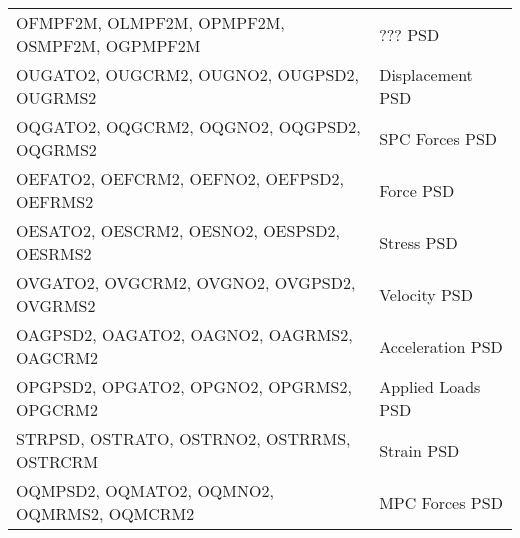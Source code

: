 \begin{tabular}{ll}
    OFMPF2M, OLMPF2M, OPMPF2M, OSMPF2M, OGPMPF2M & ??? PSD     \\

    OUGATO2, OUGCRM2, OUGNO2,  OUGPSD2, OUGRMS2  & Displacement PSD  \\
    OQGATO2, OQGCRM2, OQGNO2,  OQGPSD2, OQGRMS2  & SPC Forces PSD    \\
    OEFATO2, OEFCRM2, OEFNO2,  OEFPSD2, OEFRMS2  & Force PSD         \\
    OESATO2, OESCRM2, OESNO2,  OESPSD2, OESRMS2  & Stress PSD        \\
    OVGATO2, OVGCRM2, OVGNO2,  OVGPSD2, OVGRMS2  & Velocity PSD      \\
    OAGPSD2, OAGATO2, OAGNO2,  OAGRMS2, OAGCRM2  & Acceleration PSD  \\
    OPGPSD2, OPGATO2, OPGNO2,  OPGRMS2, OPGCRM2  & Applied Loads PSD \\
    STRPSD, OSTRATO, OSTRNO2, OSTRRMS, OSTRCRM   & Strain PSD        \\
    OQMPSD2, OQMATO2, OQMNO2,  OQMRMS2, OQMCRM2  & MPC Forces PSD    \\

\end {tabular}

